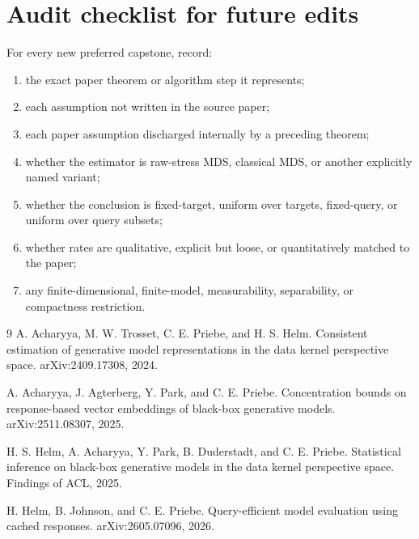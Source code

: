\documentclass[11pt]{article}
\begin{document}
\section{Audit checklist for future edits}

For every new preferred capstone, record:
\begin{enumerate}
\item the exact paper theorem or algorithm step it represents;
\item each assumption not written in the source paper;
\item each paper assumption discharged internally by a preceding theorem;
\item whether the estimator is raw-stress MDS, classical MDS, or another
      explicitly named variant;
\item whether the conclusion is fixed-target, uniform over targets, fixed-query,
      or uniform over query subsets;
\item whether rates are qualitative, explicit but loose, or quantitatively
      matched to the paper;
\item any finite-dimensional, finite-model, measurability, separability, or
      compactness restriction.
\end{enumerate}

\begin{thebibliography}{9}
A. Acharyya, M. W. Trosset, C. E. Priebe, and H. S. Helm.
\newblock Consistent estimation of generative model representations in the data
kernel perspective space.
\newblock arXiv:2409.17308, 2024.

A. Acharyya, J. Agterberg, Y. Park, and C. E. Priebe.
\newblock Concentration bounds on response-based vector embeddings of black-box
generative models.
\newblock arXiv:2511.08307, 2025.

H. S. Helm, A. Acharyya, Y. Park, B. Duderstadt, and C. E. Priebe.
\newblock Statistical inference on black-box generative models in the data
kernel perspective space.
\newblock Findings of ACL, 2025.

H. Helm, B. Johnson, and C. E. Priebe.
\newblock Query-efficient model evaluation using cached responses.
\newblock arXiv:2605.07096, 2026.
\end{thebibliography}
\end{document}
